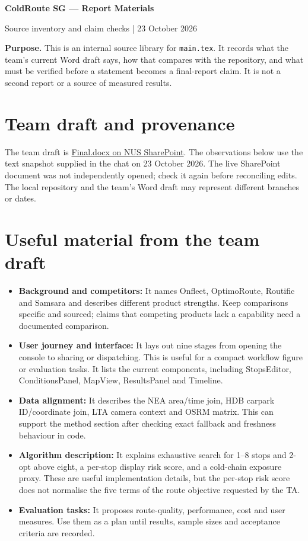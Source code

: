 \documentclass[11pt,a4paper]{article}
\begin{document}
\begin{center}
{\LARGE\bfseries ColdRoute SG --- Report Materials\par}
\vspace{0.3em}
{\large Source inventory and claim checks | 23 October 2026\par}
\end{center}

\noindent\textbf{Purpose.} This is an internal source library for \texttt{main.tex}. It records what the team's current Word draft says, how that compares with the repository, and what must be verified before a statement becomes a final-report claim. It is not a second report or a source of measured results.

\section{Team draft and provenance}
The team draft is \href{https://nusu.sharepoint.com/:w:/r/sites/CS5224CloudComputing_8dd51e/_layouts/15/Doc.aspx?sourcedoc=\%7BD59E63C5-AC56-43CE-9170-953C4CCA3FF4\%7D\&file=Final.docx\&action=default\&mobileredirect=true}{Final.docx on NUS SharePoint}. The observations below use the text snapshot supplied in the chat on 23 October 2026. The live SharePoint document was not independently opened; check it again before reconciling edits. The local repository and the team's Word draft may represent different branches or dates.

\section{Useful material from the team draft}
\begin{itemize}
  \item \textbf{Background and competitors:} It names Onfleet, OptimoRoute, Routific and Samsara and describes different product strengths. Keep comparisons specific and sourced; claims that competing products lack a capability need a documented comparison.
  \item \textbf{User journey and interface:} It lays out nine stages from opening the console to sharing or dispatching. This is useful for a compact workflow figure or evaluation tasks. It lists the current components, including StopsEditor, ConditionsPanel, MapView, ResultsPanel and Timeline.
  \item \textbf{Data alignment:} It describes the NEA area/time join, HDB carpark ID/coordinate join, LTA camera context and OSRM matrix. This can support the method section after checking exact fallback and freshness behaviour in code.
  \item \textbf{Algorithm description:} It explains exhaustive search for 1--8 stops and 2-opt above eight, a per-stop display risk score, and a cold-chain exposure proxy. These are useful implementation details, but the per-stop risk score does not normalise the five terms of the route objective requested by the TA.
  \item \textbf{Evaluation tasks:} It proposes route-quality, performance, cost and user measures. Use them as a plan until results, sample sizes and acceptance criteria are recorded.
\end{itemize}
\end{document}
